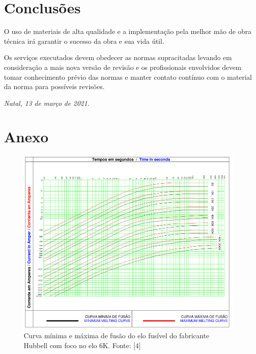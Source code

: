 \section{Conclusões}

O uso de materiais de alta qualidade e a implementação pela melhor mão de obra técnica irá garantir o sucesso da obra e sua vida útil.

Os serviços executados devem obedecer as normas supracitadas levando em consideração a mais nova versão de revisão e os profissionais envolvidos devem tomar conhecimento prévio das normas e manter contato contínuo com o material da norma para possíveis revisões.

\textit{Natal, 13 de março de 2021.}

\section{Anexo}

\begin{figure}[H] 
\centering
\includegraphics[width=16cm]{curva_fusao.png}
\caption{Curva mínima e máxima de fusão do elo fusível do fabricante Hubbell com foco no elo 6K. Fonte: [4]}
\label{curva_fusao} 
\end{figure}